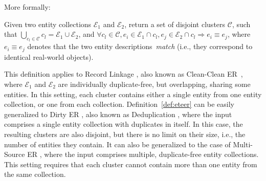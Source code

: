 More formally:
\vspace{4pt}
\begin{definition}\label{def:eteer}
Given two entity collections $\mathcal{E}_1$ and $\mathcal{E}_2$, return a set of disjoint clusters $\mathcal{C}$, such that 
$\bigcup_{c_l \in \mathcal{C}}c_l = \mathcal{E}_1 \cup \mathcal{E}_2$, and
$\forall c_l \in \mathcal{C}, 
 e_i \in \mathcal{E}_1 \cap c_l, e_j \in \mathcal{E}_2 \cap c_l \Rightarrow e_i \equiv e_j$, 
where $e_i \equiv e_j$ denotes that the two entity descriptions~\emph{match} {(i.e., they correspond to identical real-world objects)}.
\end{definition}
\vspace{4pt}


This definition applies to Record Linkage \cite{DBLP:books/daglib/0030287}, also known as Clean-Clean ER~\cite{DBLP:journals/vldb/PapadakisETHC23}, where $\mathcal{E}_1$ and $\mathcal{E}_2$ are individually duplicate-free, but overlapping, sharing some entities. In this setting, each cluster contains either a single  entity from one entity collection, or 
one from each collection. Definition~\ref{def:eteer} can be easily generalized to Dirty ER \cite{DBLP:journals/pvldb/HassanzadehCML09}, also known as Deduplication \cite{DBLP:books/daglib/0030287}, where the input comprises a single entity collection with duplicates in itself. In this case, the resulting clusters are also disjoint, but there is no limit on their size, i.e., the number of entities they contain. It can also be generalized to the case of Multi-Source ER \cite{DBLP:conf/esws/SaeediPR20,DBLP:conf/adbis/SaeediPR17}, where the input comprises multiple, duplicate-free entity collections. This setting requires that each cluster cannot contain more than one entity from the same collection. 

